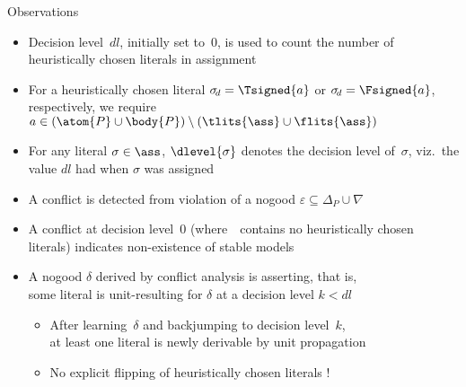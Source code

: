 \begin{frame}{Observations}
\begin{itemize}
\item Decision level~$\mathit{dl}$,
      initially set to~$0$,
      is used to count the number of heuristically chosen
      literals in assignment~\ass
\item For a heuristically chosen literal
      $\sigma_{\!d}=\Tsigned{a}$ or $\sigma_{\!d}=\Fsigned{a}$,
      respectively,
      we require $a\in(\atom{P}\cup\body{P})\setminus(\tlits{\ass}\cup\flits{\ass})$
\item For any literal $\sigma\in\ass$,
      $\dlevel{\sigma}$ denotes the decision level of~$\sigma$,
      viz.\ the value $\mathit{dl}$ had when $\sigma$ was assigned
\pause
\item A conflict is detected from violation of a nogood $\varepsilon\subseteq\Delta_P\cup\nabla$
\item A conflict at decision level~$0$
      (where~\ass\ contains no heuristically chosen literals)
      indicates non-existence of stable models
\item A nogood $\delta$ derived by conflict analysis is
      \alert{asserting}, that is,\\
      some literal is unit-resulting for $\delta$ at a decision level $k<\mathit{dl}$
\pause
  \begin{itemize}
  \item After learning~$\delta$ and backjumping to
                  decision level~$k$,\\ at least one literal is
                  newly derivable by unit propagation
  \item No explicit flipping of heuristically chosen literals !
  \end{itemize}
\end{itemize}
\end{frame}
